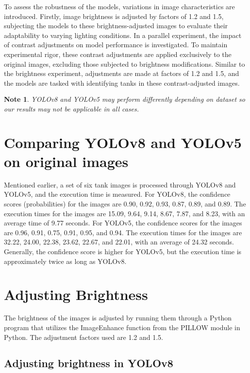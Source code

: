 \documentclass[pmlr,twocolumn,10pt]{jmlr} %
\newtheorem*{note}{Note}
\begin{document}
To assess the robustness of the models, variations in image characteristics are introduced. Firstly, image brightness is adjusted by factors of 1.2 and 1.5, subjecting the models to these brightness-adjusted images to evaluate their adaptability to varying lighting conditions. In a parallel experiment, the impact of contrast adjustments on model performance is investigated. To maintain experimental rigor, these contrast adjustments are applied exclusively to the original images, excluding those subjected to brightness modifications. Similar to the brightness experiment, adjustments are made at factors of 1.2 and 1.5, and the models are tasked with identifying tanks in these contrast-adjusted images.
\begin{note}
YOLOv8 and YOLOv5 may perform differently depending on dataset so our results may not be applicable in all cases.
\end{note}

\section{Comparing YOLOv8 and YOLOv5 on original images}

Mentioned earlier, a set of six tank images is processed through YOLOv8 and YOLOv5, and the execution time is measured. For YOLOv8, the confidence scores (probabilities) for the images are 0.90, 0.92, 0.93, 0.87, 0.89, and 0.89. The execution times for the images are 15.09, 9.64, 9.14, 8.67, 7.87, and 8.23, with an average time of 9.77 seconds. For YOLOv5, the confidence scores for the images are 0.96, 0.91, 0.75, 0.91, 0.95, and 0.94. The execution times for the images are 32.22, 24.00, 22.38, 23.62, 22.67, and 22.01, with an average of 24.32 seconds. Generally, the confidence score is higher for YOLOv5, but the execution time is approximately twice as long as YOLOv8.

\section{Adjusting Brightness}
The brightness of the images is adjusted by running them through a Python program that utilizes the ImageEnhance function from the PILLOW module in Python. The adjustment factors used are 1.2 and 1.5.

\subsection{Adjusting brightness in YOLOv8}
\label{sec:figures}
\end{document}
